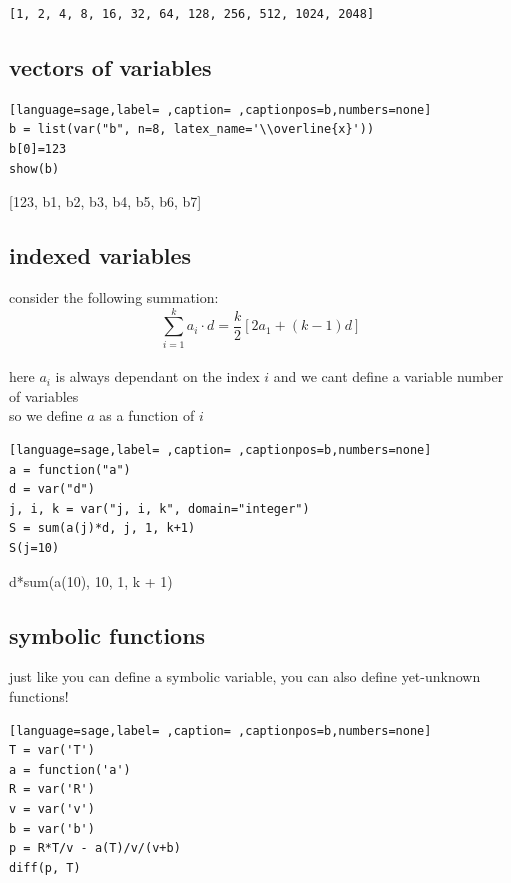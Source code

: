 \documentclass[a4paper,12pt]{article}
\begin{document}
\begin{verbatim}
[1, 2, 4, 8, 16, 32, 64, 128, 256, 512, 1024, 2048]
\end{verbatim}
\subsection{vectors of variables}
\label{sec:org5e5af58}
\begin{lstlisting}[language=sage,label= ,caption= ,captionpos=b,numbers=none]
b = list(var("b", n=8, latex_name='\\overline{x}'))
b[0]=123
show(b)
\end{lstlisting}

[123, b1, b2, b3, b4, b5, b6, b7]\\[0pt]
\subsection{indexed variables}
\label{sec:org653621e}
consider the following summation:\\[0pt]

\[ \sum_{i=1}^{k} a_i \cdot d = \dfrac{k}{2}[2a_1 + (k - 1)d] \]\\[0pt]

here \(a_i\) is always dependant on the index \(i\) and we cant define a variable number of variables\\[0pt]
so we define \(a\) as a function of \(i\)\\[0pt]

\begin{lstlisting}[language=sage,label= ,caption= ,captionpos=b,numbers=none]
a = function("a")
d = var("d")
j, i, k = var("j, i, k", domain="integer")
S = sum(a(j)*d, j, 1, k+1)
S(j=10)
\end{lstlisting}

d*sum(a(10), 10, 1, k + 1)\\[0pt]
\subsection{symbolic functions}
\label{sec:org71f0d76}
just like you can define a symbolic variable, you can also define yet-unknown functions!\\[0pt]
\begin{lstlisting}[language=sage,label= ,caption= ,captionpos=b,numbers=none]
T = var('T')
a = function('a')
R = var('R')
v = var('v')
b = var('b')
p = R*T/v - a(T)/v/(v+b)
diff(p, T)
\end{lstlisting}
\end{document}

